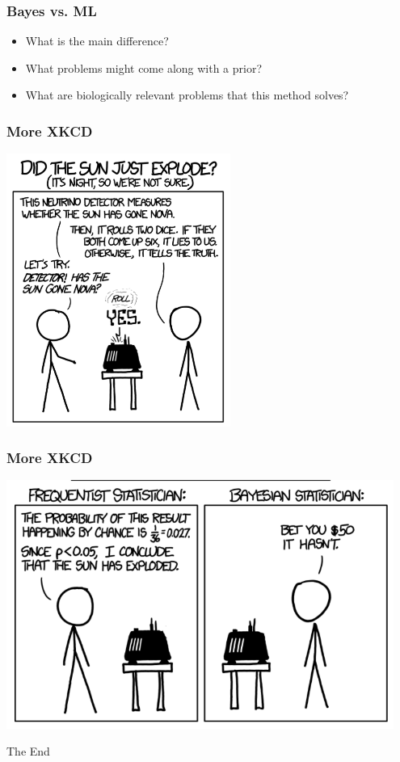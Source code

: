 \documentclass[14pt,handout]{beamer}
\begin{document}
\begin{frame}
\frametitle{Bayes vs. ML}
\begin{itemize}
	\item<+-> What is the main difference?
	\item<+-> What problems might come along with a prior?
	\item<+-> What are biologically relevant problems that this method solves?
\end{itemize}
\end{frame}

\begin{frame}
\frametitle{More XKCD}
	\begin{center}
	\includegraphics[width=0.55\textwidth]{images_20171130_xkcd1.png}
	\end{center}
\end{frame}

\begin{frame}
\frametitle{More XKCD}
	\begin{center}
	\includegraphics[width=0.95\textwidth]{images_20171130_xkcd2.png}
	\end{center}
\end{frame}

\begin{frame}
\Huge{\centerline{The End}}
\end{frame}

\end{document}
